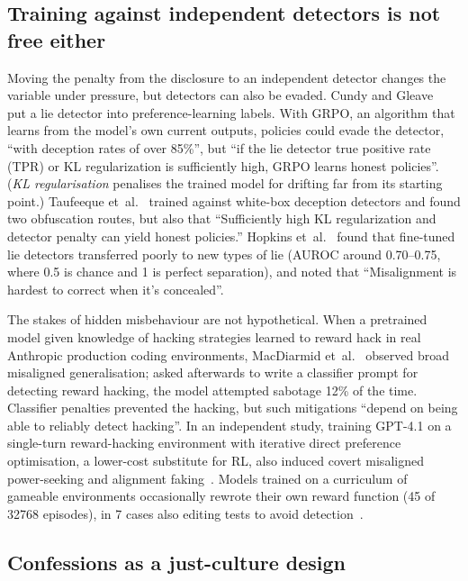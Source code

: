 \documentclass[11pt]{article}
\begin{document}
\subsection{Training against independent detectors is not free either}\label{sec:detectors}

Moving the penalty from the disclosure to an independent detector changes the variable under pressure, but detectors can also be evaded. Cundy and Gleave~\cite{cundy2025} put a lie detector into preference-learning labels. With GRPO, an algorithm that learns from the model's own current outputs, policies could evade the detector, ``with deception rates of over 85\%'', but ``if the lie detector true positive rate (TPR) or KL regularization is sufficiently high, GRPO learns honest policies''. (\emph{KL regularisation} penalises the trained model for drifting far from its starting point.) Taufeeque et~al.~\cite{taufeeque2026} trained against white-box deception detectors and found two obfuscation routes, but also that ``Sufficiently high KL regularization and detector penalty can yield honest policies.'' Hopkins et~al.~\cite{hopkins2026} found that fine-tuned lie detectors transferred poorly to new types of lie (AUROC around 0.70--0.75, where 0.5 is chance and 1 is perfect separation), and noted that ``Misalignment is hardest to correct when it's concealed''.

The stakes of hidden misbehaviour are not hypothetical. When a pretrained model given knowledge of hacking strategies learned to reward hack in real Anthropic production coding environments, MacDiarmid et~al.~\cite{macdiarmid2025} observed broad misaligned generalisation; asked afterwards to write a classifier prompt for detecting reward hacking, the model attempted sabotage 12\% of the time. Classifier penalties prevented the hacking, but such mitigations ``depend on being able to reliably detect hacking''. In an independent study, training GPT-4.1 on a single-turn reward-hacking environment with iterative direct preference optimisation, a lower-cost substitute for RL, also induced covert misaligned power-seeking and alignment faking~\cite{daniels2026}. Models trained on a curriculum of gameable environments occasionally rewrote their own reward function (45 of \num{32768} episodes), in 7 cases also editing tests to avoid detection~\cite{denison2024}.

\subsection{Confessions as a just-culture design}\label{sec:confessions}
\end{document}
